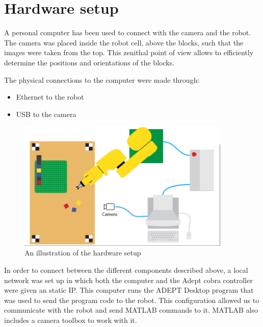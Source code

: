 \chapter{Hardware setup}\label{ch:hardware}
A personal computer has been used to connect with the camera and the robot. The camera was placed inside the robot cell, above the blocks, such that the images were taken from the top. This zenithal point of view allows to efficiently determine the positions and orientations of the blocks. 

The physical connections to the computer were made through: 
\begin{itemize}
	\item Ethernet to the robot  
	\item USB to the camera 
\end{itemize}

\begin{figure}[hb]
\centering
\includegraphics[width=4in]{figures/robotCellDesign.png}
\caption[robot Cell Design]
{An illustration of the hardware setup}
\end{figure}

In order to connect between the different components described above, a local network was set up in which both the computer and the Adept cobra controller were given an static IP. This computer runs the ADEPT Desktop program that was used to send the program code to the robot. This configuration allowed us to communicate with the robot and send MATLAB commands to it. MATLAB also includes a camera toolbox to work with it. 
